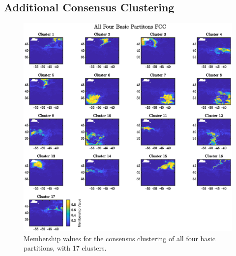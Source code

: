 \documentclass[a4paper, fontsize=12pt]{article}
\begin{document}
\begin{appendices}
\section{Additional Consensus Clustering}\label{app:cons}
\begin{figure}[H]
\begin{center}
	\includegraphics[width=\textwidth]{../figures/atlantic_member_all17.eps}
	\caption{Membership values for the consensus clustering of all four basic partitions, with 17 clusters.}
	\label{fig:extra_cons}
\end{center}
\end{figure}
\end{appendices}
\end{document}
